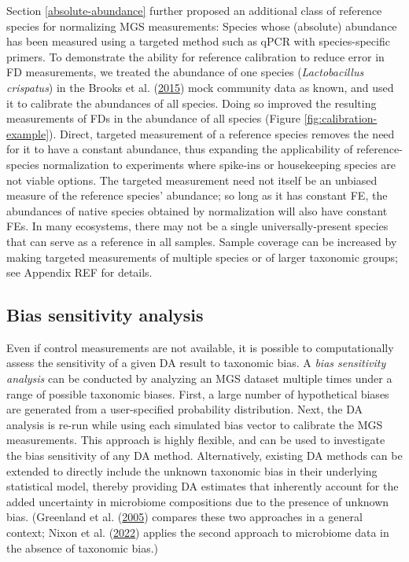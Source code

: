 \documentclass[
]{article}
\begin{document}
Section \ref{absolute-abundance} further proposed an additional class of reference species for normalizing MGS measurements: Species whose (absolute) abundance has been measured using a targeted method such as qPCR with species-specific primers.
To demonstrate the ability for reference calibration to reduce error in FD measurements, we treated the abundance of one species (\emph{Lactobacillus crispatus}) in the Brooks et al. (\protect\hyperlink{ref-brooks2015thet}{2015}) mock community data as known, and used it to calibrate the abundances of all species.
Doing so improved the resulting measurements of FDs in the abundance of all species (Figure \ref{fig:calibration-example}).
Direct, targeted measurement of a reference species removes the need for it to have a constant abundance, thus expanding the applicability of reference-species normalization to experiments where spike-ins or housekeeping species are not viable options.
The targeted measurement need not itself be an unbiased measure of the reference species' abundance; so long as it has constant FE, the abundances of native species obtained by normalization will also have constant FEs.
In many ecosystems, there may not be a single universally-present species that can serve as a reference in all samples.
Sample coverage can be increased by making targeted measurements of multiple species or of larger taxonomic groups; see Appendix REF for details.

\hypertarget{bias-sensitivity-analysis}{%
\subsection{Bias sensitivity analysis}\label{bias-sensitivity-analysis}}

Even if control measurements are not available, it is possible to computationally assess the sensitivity of a given DA result to taxonomic bias.
A \emph{bias sensitivity analysis} can be conducted by analyzing an MGS dataset multiple times under a range of possible taxonomic biases.
First, a large number of hypothetical biases are generated from a user-specified probability distribution.
Next, the DA analysis is re-run while using each simulated bias vector to calibrate the MGS measurements.
This approach is highly flexible, and can be used to investigate the bias sensitivity of any DA method.
Alternatively, existing DA methods can be extended to directly include the unknown taxonomic bias in their underlying statistical model, thereby providing DA estimates that inherently account for the added uncertainty in microbiome compositions due to the presence of unknown bias.
(Greenland et al. (\protect\hyperlink{ref-greenland2005mult}{2005}) compares these two approaches in a general context; Nixon et al. (\protect\hyperlink{ref-nixon2022asta}{2022}) applies the second approach to microbiome data in the absence of taxonomic bias.)
\end{document}
